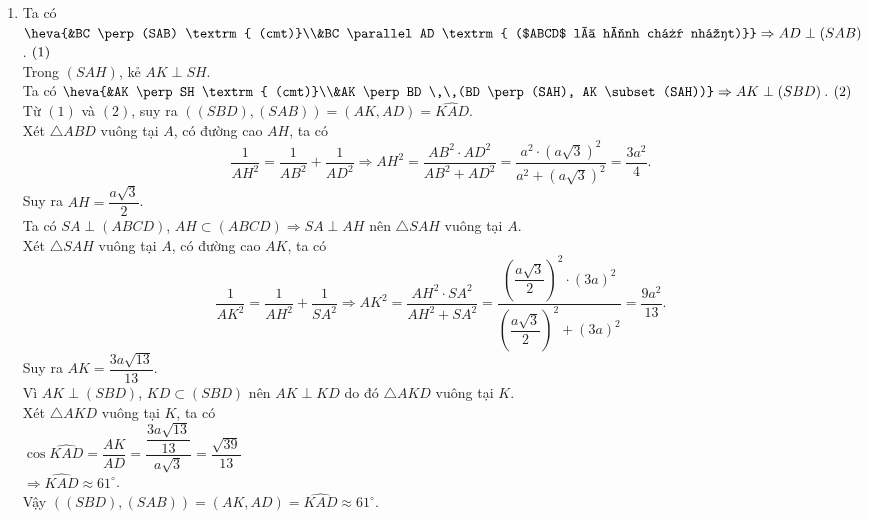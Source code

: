 \begin{bt}
{\begin{enumerate}
		\item Ta có $\heva{&BC \perp (SAB) \textrm{ (cmt)}\\&BC \parallel AD \textrm{  ($ABCD$ là hình chữ nhật)}} \Rightarrow AD \perp (SAB)$. $\hfill (1)$\\
		Trong  $(SAH)$, kẻ $AK \perp SH$.\\
		Ta có $\heva{&AK \perp SH \textrm{ (cmt)}\\&AK \perp BD \,\,(BD \perp (SAH), AK \subset (SAH))} \Rightarrow AK \perp (SBD)$.  $\hfill (2)$\\
		Từ $(1)$ và $(2)$, suy ra $\left((SBD),(SAB)\right) = \left(AK, AD\right) =  \widehat{KAD}$.\\
		Xét $\triangle ABD$ vuông tại  $A$, có đường cao $AH$, ta có
		$$ \dfrac{1}{AH^2} = \dfrac{1}{AB^2} +  \dfrac{1}{AD^2} \Rightarrow AH^2 = \dfrac{AB^2\cdot AD^2}{AB^2 + AD^2} = \dfrac{a^2\cdot (a\sqrt{3})^2}{a^2 + (a\sqrt{3})^2} = \dfrac{3a^2}{4}. $$
		Suy ra $AH = \dfrac{a\sqrt{3}}{2}$.\\ 
		Ta có $SA \perp (ABCD)$, $AH \subset (ABCD) \Rightarrow SA \perp AH$  nên $\triangle SAH$ vuông tại $A$.\\
		Xét $\triangle  SAH$ vuông tại $A$, có đường cao $AK$, ta có
		$$ \dfrac{1}{AK^2} = \dfrac{1}{AH^2} + \dfrac{1}{SA^2} \Rightarrow AK^2 =  \dfrac{AH^2\cdot SA^2}{AH^2 + SA^2} = \dfrac{\left(\dfrac{a\sqrt{3}}{2}\right)^2\cdot (3a)^2}{\left(\dfrac{a\sqrt{3}}{2}\right)^2 + (3a)^2} = \dfrac{9a^2}{13}. $$
		Suy  ra $AK = \dfrac{3a\sqrt{13}}{13}$.\\
		Vì $AK \perp (SBD)$, $KD \subset (SBD)$ nên  $AK \perp KD$ do đó $\triangle AKD$ vuông tại $K$.\\
		Xét $\triangle  AKD$ vuông tại $K$, ta có\\
		$\cos\widehat{KAD} =  \dfrac{AK}{AD} = \dfrac{\dfrac{3a\sqrt{13}}{13}}{a\sqrt{3}} = \dfrac{\sqrt{39}}{13}$\\
		$\Rightarrow \widehat{KAD} \approx 61^\circ$.\\ 
		Vậy $\left((SBD),(SAB)\right) =  \left(AK, AD\right) = \widehat{KAD} \approx 61^\circ$.
	\end{enumerate}
} 
\end{bt}

